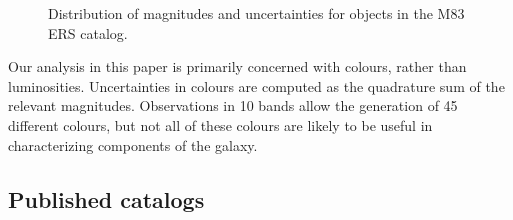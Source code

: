 \begin{figure}
\centering
{}
\hfill
{}
\caption{Distribution of magnitudes and uncertainties for objects in the \citet{chandar10} M83 ERS catalog.}
\label{fig:mag_unc}
\end{figure}

Our analysis in this paper is primarily concerned with colours, rather than luminosities.
Uncertainties in colours are computed as the quadrature sum of the relevant magnitudes.
Observations in 10 bands allow the generation of 45 different colours,
but not all of these colours are likely to be useful in characterizing components of the galaxy.

\subsection{Published catalogs}

